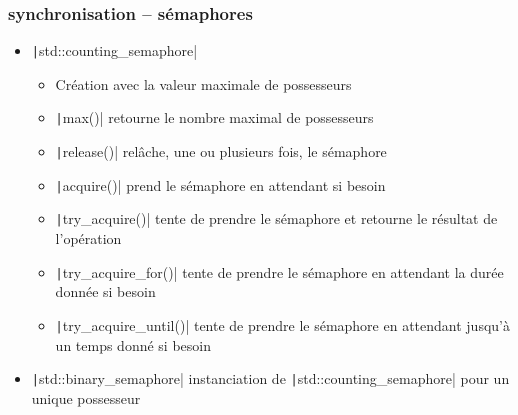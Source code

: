 \documentclass[C++.tex]{subfiles}
\begin{document}
\begin{frame}[fragile]
\end{frame}

\begin{frame}[fragile]
	\frametitle{synchronisation -- sémaphores}
	\begin{itemize}
		\item \texttt|std::counting_semaphore|
		\begin{itemize}
			\item Création avec la valeur maximale de possesseurs
			\item \texttt|max()| retourne le nombre maximal de possesseurs
			\item \texttt|release()| relâche, une ou plusieurs fois, le sémaphore


			\item \texttt|acquire()| prend le sémaphore en attendant si besoin


			\item \texttt|try_acquire()| tente de prendre le sémaphore et retourne le résultat de l'opération


			\item \texttt|try_acquire_for()| tente de prendre le sémaphore en attendant la durée donnée si besoin
			\item \texttt|try_acquire_until()| tente de prendre le sémaphore en attendant jusqu'à un temps donné si besoin
		\end{itemize}
		\item \texttt|std::binary_semaphore|	instanciation de \texttt|std::counting_semaphore| pour un unique possesseur
	\end{itemize}


\end{frame}
\end{document}

